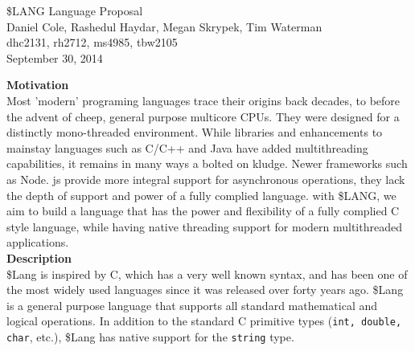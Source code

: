 \documentclass[11pt, oneside]{article}   	%
\date{}							%
\begin{document}
\begin{center}
\LARGE
\$LANG Language Proposal\\[2em]
\Large 
Daniel Cole, Rashedul Haydar, Megan Skrypek, Tim Waterman\\
\large dhc2131, rh2712, ms4985, tbw2105\\[2em]
\normalsize
September 30, 2014\\[3em]
\end{center}

\LARGE\textbf{Motivation}\\[.5em]
\normalsize
Most 'modern' programing languages trace their origins back decades, to before the advent of cheep, general purpose multicore CPUs.  They were designed for a distinctly mono-threaded environment.  While libraries and enhancements to mainstay languages such as C/C++ and Java have added multithreading capabilities, it remains in many ways a bolted on kludge.  Newer frameworks such as Node. js provide more integral support for asynchronous operations, they lack the depth of support and power of a fully complied language.  with \$LANG, we aim to build a language that has the power and flexibility of a fully complied C style language, while having native threading support for modern multithreaded applications.
\\[3em]
\LARGE\textbf{Description}\\[.5em]
\normalsize
\$Lang is inspired by C, which has a very well known syntax, and has been one of the most widely used languages since it was released over forty years ago.  \$Lang is a general purpose language that supports all standard mathematical and logical operations.  In addition to the standard C primitive types (\verb|int, double, char|, etc.), \$Lang has native support for the \verb|string| type.  
\end{document}
